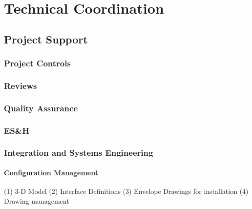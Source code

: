\chapter{Technical Coordination}
\label{ch:fdsp-coord}

\section{Project Support}
\label{sec:fdsp-coord-supp}


\subsection{Project Controls}
\label{sec:fdsp-coord-controls}


\subsection{Reviews}
\label{sec:fdsp-coord-reviews}


\subsection{Quality Assurance}
\label{sec:fdsp-coord-qa}


\subsection{ES\&H}
\label{sec:fdsp-coord-esh}


\subsection{Integration and Systems Engineering }
\label{sec:fdsp-coord-integ-sysengr}

\subsubsection{Configuration Management}
\label{sec:fdsp-coord-integ-config}
  	
   (1)	3-D Model
   (2)	Interface Definitions
   (3)	Envelope Drawings for installation
   (4)	Drawing management

